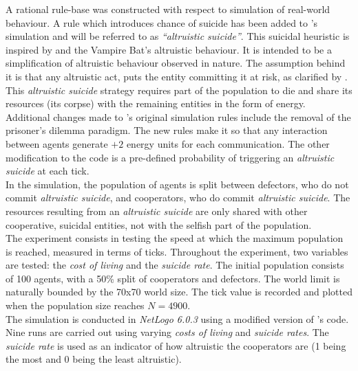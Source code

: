 \documentclass[a4paper,12pt,twocolumn]{article}
\begin{document}
A rational rule-base was constructed with respect to simulation of real-world behaviour. A rule which introduces chance of suicide has been added to \citeauthor{smaldino}'s simulation and will be referred to as \textit{``altruistic suicide''}. This suicidal heuristic is inspired by \citet{bats} and the Vampire Bat's altruistic behaviour. It is intended to be a simplification of altruistic behaviour observed in nature. The assumption behind it is that any altruistic act, puts the entity committing it at risk, as clarified by \citet[p. 451]{smaldino}. This \textit{altruistic suicide} strategy requires part of the population to die and share its resources (its corpse) with the remaining entities in the form of energy.\\

Additional changes made to \citet{smaldino}'s original simulation rules include the removal of the prisoner's dilemma paradigm. The new rules make it so that any interaction between agents generate $+2$ energy units for each communication. The other modification to the code is a pre-defined probability of triggering an \textit{altruistic suicide} at each tick.\\

In the simulation, the population of agents is split between defectors, who do not commit \textit{altruistic suicide}, and cooperators, who do commit \textit{altruistic suicide}. The resources resulting from an \textit{altruistic suicide} are only shared with other cooperative, suicidal entities, not with the selfish part of the population.\\

The experiment consists in testing the speed at which the maximum population is reached, measured in terms of ticks. Throughout the experiment, two variables are tested: the \textit{cost of living} and the \textit{suicide rate}. The initial population consists of 100 agents, with a 50\% split of cooperators and defectors. The world limit is naturally bounded by the 70x70 world size. The tick value is recorded and plotted when the population size reaches $N=4900$.\\

The simulation is conducted in \textit{NetLogo 6.0.3} using a modified version of \cite{smaldino}'s code. Nine runs are carried out using varying \textit{costs of living} and \textit{suicide rates}. The \textit{suicide rate} is used as an indicator of how altruistic the cooperators are (1 being the most and 0 being the least altruistic).
\end{document}
